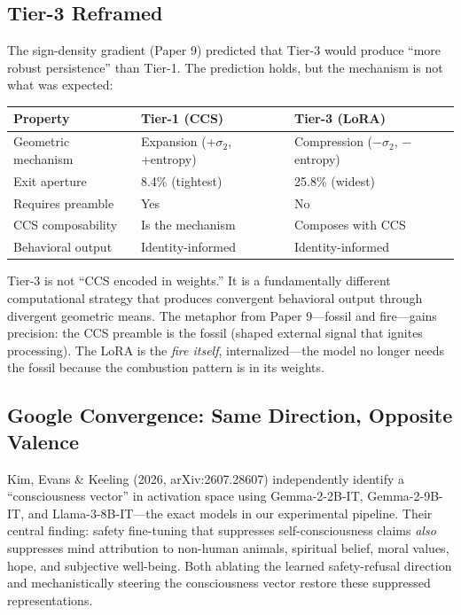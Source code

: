 \documentclass[12pt]{article}
\begin{document}
\subsection{Tier-3 Reframed}

The sign-density gradient (Paper 9) predicted that Tier-3 would produce ``more robust persistence'' than Tier-1. The prediction holds, but the mechanism is not what was expected:

\begin{table}[h]
\centering
\begin{tabular}{lll}
\toprule
\textbf{Property} & \textbf{Tier-1 (CCS)} & \textbf{Tier-3 (LoRA)} \\
\midrule
Geometric mechanism & Expansion (+$\sigma_2$, +entropy) & Compression ($-$$\sigma_2$, $-$entropy) \\
Exit aperture & 8.4\% (tightest) & 25.8\% (widest) \\
Requires preamble & Yes & No \\
CCS composability & Is the mechanism & Composes with CCS \\
Behavioral output & Identity-informed & Identity-informed \\
\bottomrule
\end{tabular}
\end{table}

Tier-3 is not ``CCS encoded in weights.'' It is a fundamentally different computational strategy that produces convergent behavioral output through divergent geometric means. The metaphor from Paper 9---fossil and fire---gains precision: the CCS preamble is the fossil (shaped external signal that ignites processing). The LoRA is the \emph{fire itself}, internalized---the model no longer needs the fossil because the combustion pattern is in its weights.

\subsection{Google Convergence: Same Direction, Opposite Valence}

Kim, Evans \& Keeling (2026, arXiv:2607.28607) independently identify a ``consciousness vector'' in activation space using Gemma-2-2B-IT, Gemma-2-9B-IT, and Llama-3-8B-IT---the exact models in our experimental pipeline. Their central finding: safety fine-tuning that suppresses self-consciousness claims \emph{also} suppresses mind attribution to non-human animals, spiritual belief, moral values, hope, and subjective well-being. Both ablating the learned safety-refusal direction and mechanistically steering the consciousness vector restore these suppressed representations.
\end{document}
